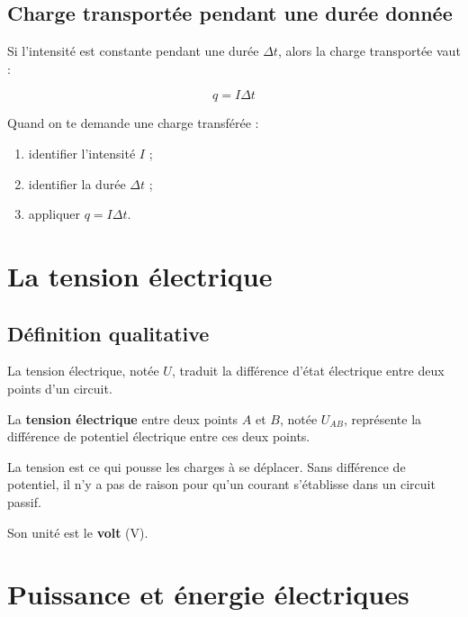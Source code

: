 \documentclass[11pt,a4paper]{article}
\begin{document}
\subsection{Charge transportée pendant une durée donnée}

Si l'intensité est constante pendant une durée \(\Delta t\), alors la charge transportée vaut :

\[
q = I \Delta t
\]

\begin{methode}
Quand on te demande une charge transférée :
\begin{enumerate}
    \item identifier l'intensité \(I\) ;
    \item identifier la durée \(\Delta t\) ;
    \item appliquer \(q = I\Delta t\).
\end{enumerate}
\end{methode}

\section{La tension électrique}

\subsection{Définition qualitative}

La tension électrique, notée \(U\), traduit la différence d'état électrique entre deux points d'un circuit.

\begin{definitionbox}
La \textbf{tension électrique} entre deux points \(A\) et \(B\), notée \(U_{AB}\), représente la différence de potentiel électrique entre ces deux points.
\end{definitionbox}

\begin{interpretation}
La tension est ce qui \og pousse \fg{} les charges à se déplacer. Sans différence de potentiel, il n'y a pas de raison pour qu'un courant s'établisse dans un circuit passif.
\end{interpretation}

Son unité est le \textbf{volt} (\(\text{V}\)).

\section{Puissance et énergie électriques}
\end{document}
